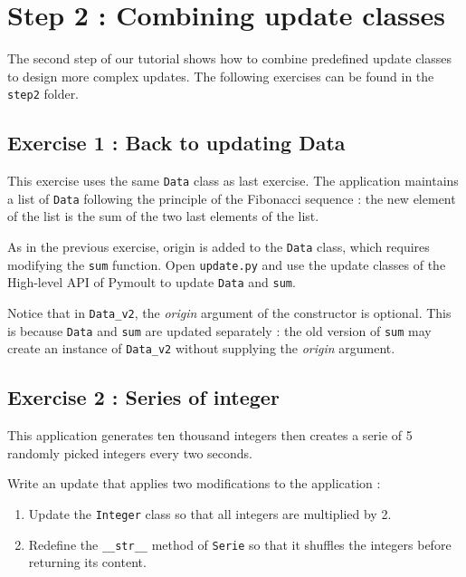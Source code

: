 \documentclass{article}
\begin{document}
\section{Step 2 : Combining update classes} 

The second step of our tutorial shows how to combine predefined update
classes to design more complex updates. The following exercises can be
found in the \texttt{step2} folder.

\subsection{Exercise 1 : Back to updating Data}

This exercise uses the same \texttt{Data} class as last exercise. The
application maintains a list of \texttt{Data} following the principle
of the Fibonacci sequence : the new element of the list is the sum of
the two last elements of the list.

As in the previous exercise, origin is added to the \texttt{Data}
class, which requires modifying the \texttt{sum} function. Open
\texttt{update.py} and use the update classes of the High-level API of
Pymoult to update \texttt{Data}  and \texttt{sum}.

Notice that in \texttt{Data\_v2}, the \textit{origin} argument of the
constructor is optional. This is because \texttt{Data} and
\texttt{sum} are updated separately : the old version of \texttt{sum}
may create an instance of \texttt{Data\_v2} without supplying the
\textit{origin} argument.

\subsection{Exercise 2 : Series of integer}

This application generates ten thousand integers then creates a serie
of 5 randomly picked integers every two seconds.

Write an update that applies two modifications to the application :

\begin{enumerate}

\item Update the \texttt{Integer} class so that all integers are multiplied by 2.

\item Redefine the \texttt{\_\_str\_\_} method of \texttt{Serie} so that
  it shuffles the integers before returning its content.

\end{enumerate}
\end{document}
